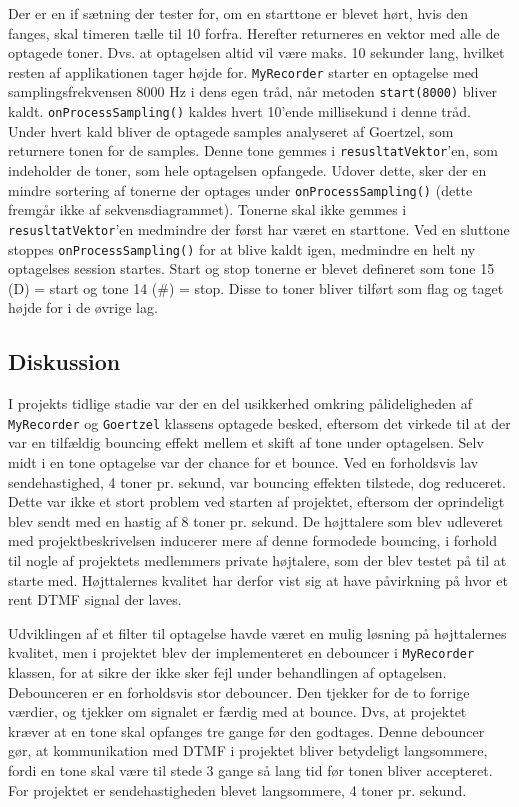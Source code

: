  Der er en if sætning der tester for, om en starttone er blevet hørt, hvis den fanges, skal timeren tælle til 10 forfra. Herefter returneres en vektor med alle de optagede toner. Dvs. at optagelsen altid vil være maks. 10 sekunder lang, hvilket resten af applikationen tager højde for.
\newline
\texttt{MyRecorder} starter en optagelse med samplingsfrekvensen 8000 Hz i dens egen tråd, når metoden \texttt{start(8000)} bliver kaldt. \texttt{onProcessSampling()} kaldes hvert 10’ende millisekund i denne tråd. Under hvert kald bliver de optagede samples analyseret af Goertzel, som returnere tonen for de samples. Denne tone gemmes i \texttt{resusltatVektor}’en, som indeholder de toner, som hele optagelsen opfangede. Udover dette, sker der en mindre sortering af tonerne der optages under \texttt{onProcessSampling()} (dette fremgår ikke af sekvensdiagrammet). Tonerne skal ikke gemmes i \texttt{resusltatVektor}’en medmindre der først har været en starttone. Ved en sluttone stoppes \texttt{onProcessSampling()} for at blive kaldt igen, medmindre en helt ny optagelses session startes. Start og stop tonerne er blevet  defineret som tone 15 (D) = start og tone 14 (\#) = stop. Disse to toner bliver tilført som flag og taget højde for i de øvrige lag.

\subsection{Diskussion}
I projekts tidlige stadie var der en del usikkerhed omkring pålideligheden af \texttt{MyRecorder} og \texttt{Goertzel} klassens optagede besked, eftersom det virkede til at der var en tilfældig bouncing effekt mellem et skift af tone under optagelsen. Selv midt i en tone optagelse var der chance for et bounce. Ved en forholdsvis lav sendehastighed, 4 toner pr. sekund, var bouncing effekten tilstede, dog reduceret.
\newline
Dette var ikke et stort problem ved starten af projektet, eftersom der oprindeligt blev sendt med en hastig af 8 toner pr. sekund. De højttalere som blev udleveret med projektbeskrivelsen inducerer mere af denne formodede bouncing, i forhold til nogle af projektets medlemmers private højtalere, som der blev testet på til at starte med.
\newline
Højttalernes kvalitet har derfor vist sig at have påvirkning på hvor et rent DTMF signal der laves.
\hfill \break

Udviklingen af et filter til optagelse havde været en mulig løsning på højttalernes kvalitet, men i projektet blev der implementeret en debouncer i \texttt{MyRecorder} klassen, for at sikre der ikke sker fejl under behandlingen af optagelsen. Debounceren er en forholdsvis stor debouncer. Den tjekker for de to forrige værdier, og tjekker om signalet er færdig med at bounce. Dvs, at projektet kræver at en tone skal opfanges tre gange før den godtages. Denne debouncer gør, at kommunikation med DTMF i projektet bliver betydeligt langsommere, fordi en tone skal være til stede 3 gange så lang tid før tonen bliver accepteret. For projektet er sendehastigheden blevet langsommere, 4 toner pr. sekund.
\hfill \break

